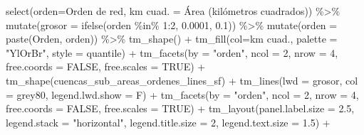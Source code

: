 \documentclass[spanish]{article}
\newenvironment{Shaded}{\begin{snugshade}}{\end{snugshade}}
\newcommand{\AttributeTok}[1]{\textcolor[rgb]{0.77,0.63,0.00}{#1}}
\newcommand{\ConstantTok}[1]{\textcolor[rgb]{0.00,0.00,0.00}{#1}}
\newcommand{\DecValTok}[1]{\textcolor[rgb]{0.00,0.00,0.81}{#1}}
\newcommand{\FloatTok}[1]{\textcolor[rgb]{0.00,0.00,0.81}{#1}}
\newcommand{\FunctionTok}[1]{\textcolor[rgb]{0.00,0.00,0.00}{#1}}
\newcommand{\NormalTok}[1]{#1}
\newcommand{\OtherTok}[1]{\textcolor[rgb]{0.56,0.35,0.01}{#1}}
\newcommand{\SpecialCharTok}[1]{\textcolor[rgb]{0.00,0.00,0.00}{#1}}
\newcommand{\StringTok}[1]{\textcolor[rgb]{0.31,0.60,0.02}{#1}}
\begin{document}
\begin{Shaded}
\begin{Highlighting}[]
  \FunctionTok{select}\NormalTok{(}\AttributeTok{orden=}\StringTok{\textasciigrave{}}\AttributeTok{Orden de red}\StringTok{\textasciigrave{}}\NormalTok{, }\StringTok{\textasciigrave{}}\AttributeTok{km cuad.}\StringTok{\textasciigrave{}} \OtherTok{=} \StringTok{\textasciigrave{}}\AttributeTok{Área (kilómetros cuadrados)}\StringTok{\textasciigrave{}}\NormalTok{) }\SpecialCharTok{\%\textgreater{}\%} 
  \FunctionTok{mutate}\NormalTok{(}\AttributeTok{grosor =} \FunctionTok{ifelse}\NormalTok{(orden }\SpecialCharTok{\%in\%} \DecValTok{1}\SpecialCharTok{:}\DecValTok{2}\NormalTok{, }\FloatTok{0.0001}\NormalTok{, }\FloatTok{0.1}\NormalTok{)) }\SpecialCharTok{\%\textgreater{}\%} 
  \FunctionTok{mutate}\NormalTok{(}\AttributeTok{orden =} \FunctionTok{paste}\NormalTok{(}\StringTok{\textquotesingle{}Orden\textquotesingle{}}\NormalTok{, orden)) }\SpecialCharTok{\%\textgreater{}\%}
  \FunctionTok{tm\_shape}\NormalTok{() }\SpecialCharTok{+}
  \FunctionTok{tm\_fill}\NormalTok{(}\AttributeTok{col=}\StringTok{\textquotesingle{}km cuad.\textquotesingle{}}\NormalTok{, }\AttributeTok{palette =} \StringTok{"YlOrBr"}\NormalTok{, }\AttributeTok{style =} \StringTok{\textquotesingle{}quantile\textquotesingle{}}\NormalTok{) }\SpecialCharTok{+}
  \FunctionTok{tm\_facets}\NormalTok{(}\AttributeTok{by =} \StringTok{"orden"}\NormalTok{, }\AttributeTok{ncol =} \DecValTok{2}\NormalTok{, }\AttributeTok{nrow =} \DecValTok{4}\NormalTok{, }\AttributeTok{free.coords =} \ConstantTok{FALSE}\NormalTok{, }\AttributeTok{free.scales =} \ConstantTok{TRUE}\NormalTok{) }\SpecialCharTok{+}
  \FunctionTok{tm\_shape}\NormalTok{(cuencas\_sub\_areas\_ordenes\_lines\_sf) }\SpecialCharTok{+}
  \FunctionTok{tm\_lines}\NormalTok{(}\AttributeTok{lwd =} \StringTok{\textquotesingle{}grosor\textquotesingle{}}\NormalTok{, }\AttributeTok{col =} \StringTok{\textquotesingle{}grey80\textquotesingle{}}\NormalTok{, }\AttributeTok{legend.lwd.show =}\NormalTok{ F) }\SpecialCharTok{+}
  \FunctionTok{tm\_facets}\NormalTok{(}\AttributeTok{by =} \StringTok{"orden"}\NormalTok{, }\AttributeTok{ncol =} \DecValTok{2}\NormalTok{, }\AttributeTok{nrow =} \DecValTok{4}\NormalTok{, }\AttributeTok{free.coords =} \ConstantTok{FALSE}\NormalTok{, }\AttributeTok{free.scales =} \ConstantTok{TRUE}\NormalTok{) }\SpecialCharTok{+}
  \FunctionTok{tm\_layout}\NormalTok{(}\AttributeTok{panel.label.size =} \FloatTok{2.5}\NormalTok{, }\AttributeTok{legend.stack =} \StringTok{"horizontal"}\NormalTok{,}
            \AttributeTok{legend.title.size =} \DecValTok{2}\NormalTok{, }\AttributeTok{legend.text.size =} \FloatTok{1.5}\NormalTok{) }\SpecialCharTok{+} 

\end{Highlighting}
\end{Shaded}
\end{document}
